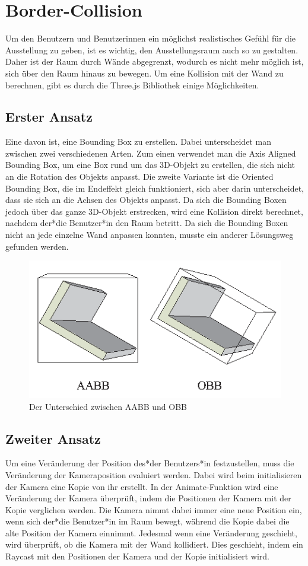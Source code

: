 \section{Border-Collision}

Um den Benutzern und Benutzerinnen ein möglichst realistisches Gefühl für die Ausstellung zu geben, ist es wichtig, den Ausstellungsraum auch so zu gestalten. Daher ist der Raum durch Wände abgegrenzt, wodurch es nicht mehr möglich ist, sich über den Raum hinaus zu bewegen. 
Um eine Kollision mit der Wand zu berechnen, gibt es durch die Three.js Bibliothek einige Möglichkeiten.
\subsection{Erster Ansatz}
Eine davon ist, eine Bounding Box zu erstellen. Dabei unterscheidet man zwischen zwei verschiedenen Arten. Zum einen verwendet man die Axis Aligned Bounding Box, um eine Box rund um das 3D-Objekt zu erstellen, die sich nicht an die Rotation des Objekts anpasst. Die zweite Variante ist die Oriented Bounding Box, die im Endeffekt gleich funktioniert, sich aber darin unterscheidet, dass sie sich an die Achsen des Objekts anpasst. Da sich die Bounding Boxen jedoch über das ganze 3D-Objekt erstrecken, wird eine Kollision direkt berechnet, nachdem der*die Benutzer*in den Raum betritt. Da sich die Bounding Boxen nicht an jede einzelne Wand anpassen konnten, musste ein anderer Lösungsweg gefunden werden.

\begin{figure}
    \centering
    \includegraphics[scale=0.65]{pics/aabb_obb.png}
    \caption{Der Unterschied zwischen AABB und OBB}
    \label{fig:impl:aabb_obb}
\end{figure}

\subsection{Zweiter Ansatz}
Um eine Veränderung der Position des*der Benutzers*in festzustellen, muss die Veränderung der Kameraposition evaluiert werden. Dabei wird beim initialisieren der Kamera eine Kopie von ihr erstellt. In der Animate-Funktion wird eine Veränderung der Kamera überprüft, indem die Positionen der Kamera mit der Kopie verglichen werden. Die Kamera nimmt dabei immer eine neue Position ein, wenn sich der*die Benutzer*in im Raum bewegt, während die Kopie dabei die alte Position der Kamera einnimmt.    
Jedesmal wenn eine Veränderung geschieht, wird überprüft, ob die Kamera mit der Wand kollidiert. Dies geschieht, indem ein Raycast mit den Positionen der Kamera und der Kopie initialisiert wird. 
